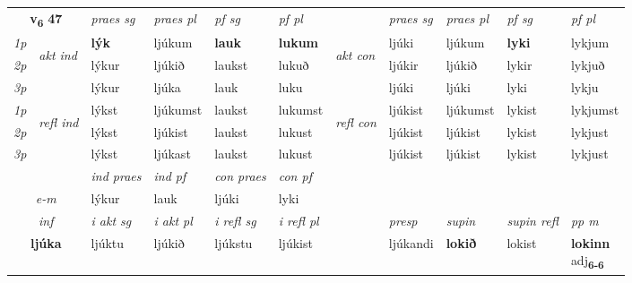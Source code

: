 \noindent
\begin{tabular}{lllllllllll} \toprule
\multicolumn{2}{c}{\textbf{v{\textsubscript{6}}} \Large{\textbf{47}}}  &  \textit{praes sg}  & \textit{praes pl}  &\textit{ pf sg} & \textit{pf pl} &  &  \textit{praes sg}  & \textit{praes pl}  & \textit{pf sg} & \textit{pf pl } \\*
	\cmidrule{3-6} \cmidrule{8-11}
 {\textit{1p}} & \multirow{3}{*}{\begin{turn}{90}\textit{akt ind}\end{turn}} & \textbf{lýk} & ljúkum & \textbf{lauk} & \textbf{lukum} & \multirow{3}{*}{\begin{turn}{90}\textit{akt con}\end{turn}} &ljúki & ljúkum & \textbf{lyki} & lykjum\\*
 {\textit{2p}} &  &  lýkur  & ljúkið & laukst & lukuð & & ljúkir & ljúkið & lykir & lykjuð \\*
{\textit{3p}} &  & lýkur & ljúka & lauk & luku & & ljúki & ljúki& lyki & lykju \\*
\cmidrule{3-6} \cmidrule{8-11}
 {\textit{1p}} & \multirow{3}{*}{\begin{turn}{90}\textit{refl ind}\end{turn}}  & lýkst & ljúkumst & laukst & lukumst & \multirow{3}{*}{\begin{turn}{90}\textit{refl con}\end{turn}}  &ljúkist & ljúkumst & lykist & lykjumst \\*
 {\textit{2p}} &  & lýkst & ljúkist & laukst & lukust & &ljúkist & ljúkist & lykist & lykjust \\*
 {\textit{3p}}  & & lýkst & ljúkast & laukst & lukust & & ljúkist & ljúkist& lykist & lykjust \\*
\cmidrule{3-6} \cmidrule{8-11}

   & &  \textit{ind praes} & \textit{ind pf} & \textit{con praes} & \textit{con pf} \\*
\multicolumn{2}{c}{ \textit{e-m} } & lýkur & lauk & ljúki & lyki \\*

\cmidrule{3-11}
   \multicolumn{2}{c}{\textit{inf}}  & \textit{i akt sg} & \textit{i akt pl} & \textit{i refl sg} & \textit{i refl pl} && \textit{presp} & \textit{supin} & \textit{supin refl} & \textit{pp m} \\*
  \multicolumn{2}{c}{\textbf{ljúka}} & ljúktu  & ljúkið & ljúkstu & ljúkist && ljúkandi &  \textbf{lokið} & lokist & \specialcell{\textbf{lokinn} \\ adj\textbf{\textsubscript{6-6}}} \\*
\end{tabular}


